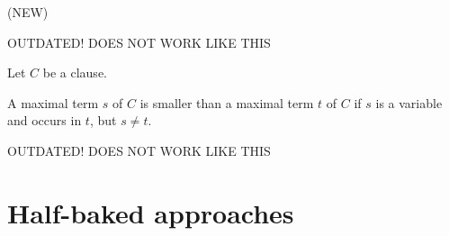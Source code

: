 \documentclass[,%
	paper=a4,%
	DIV14, 
	liststotoc,
	bibtotoc,
	draft=false,%
	numbers=noendperiod
]{scrartcl}
\begin{document}
\begin{defi}
	\label{def:order}
	(NEW)

	OUTDATED! DOES NOT WORK LIKE THIS

	Let $C$ be a clause.

	A maximal term $s$ of $C$ is smaller than a maximal term $t$ of $C$ if $s$ is a variable and occurs in $t$, but $s\neq t$. 

	OUTDATED! DOES NOT WORK LIKE THIS

\end{defi}

\section{Half-baked approaches}
\end{document}
